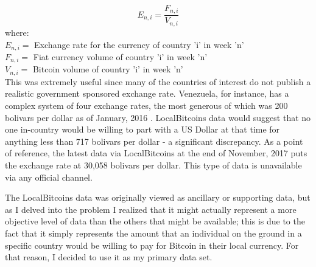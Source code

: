 \documentclass[journal]{vgtc}                %
\begin{document}
\begin{equation}\label{key}
E_{n,i} = \frac{F_{n,i}}{V_{n,i}}
\end{equation}
where:\\
$ E_{n,i} = $ Exchange rate for the currency of country 'i' in week 'n'\\
$ F_{n,i} = $ Fiat currency volume of country 'i' in week 'n'\\
$ V_{n,i} = $ Bitcoin volume of country 'i' in week 'n'\\

 This was extremely useful since many of the countries of interest do not publish a realistic government sponsored exchange rate.  Venezuela, for instance, has a complex system of four exchange rates, the most generous of which was 200 bolivars per dollar as of January, 2016 \cite{edisilvestro-1}.  LocalBitcoins data would suggest that no one in-country would be willing to part with a US Dollar at that time for anything less than 717 bolivars per dollar - a significant discrepancy.  As a point of reference, the latest data via LocalBitcoins at the end of November, 2017 puts the exchange rate at 30,058 bolivars per dollar.  This type of data is unavailable via any official channel.

The LocalBitcoins data was originally viewed as ancillary or supporting data, but as I delved into the problem I realized that it might actually represent a more objective level of data than the others that might be available; this is due to the fact that it simply represents the amount that an individual on the ground in a specific country would be willing to pay for Bitcoin in their local currency.  For that reason, I decided to use it as my primary data set.
\end{document}
